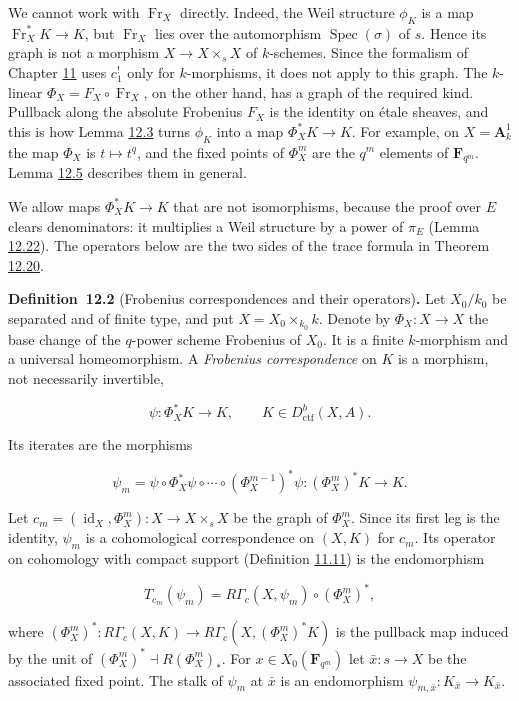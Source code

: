 \documentclass[11pt]{article}
\newenvironment{bpstatement}[2]{\par\addvspace{0.6\baselineskip}\noindent\textbf{#1}#2\textbf{.}\enspace\ignorespaces}
  {\par\addvspace{0.4\baselineskip}}
\begin{document}
We cannot work with \(\operatorname{Fr}_X\) directly. Indeed, the Weil structure \(\phi_K\) is a map \(\operatorname{Fr}_X^*K\to K\), but \(\operatorname{Fr}_X\) lies over the automorphism \(\operatorname{Spec}(\sigma)\) of \(s\). Hence its graph is not a morphism \(X\to X\times_sX\) of \(k\)-schemes. Since the formalism of Chapter \hyperref[bp170]{11} uses \(c_1^!\) only for \(k\)-morphisms, it does not apply to this graph. The \(k\)-linear \(\Phi_X=F_X\circ\operatorname{Fr}_X\), on the other hand, has a graph of the required kind. Pullback along the absolute Frobenius \(F_X\) is the identity on étale sheaves, and this is how Lemma \hyperref[bp234]{12.3} turns \(\phi_K\) into a map \(\Phi_X^*K\to K\). For example, on \(X=\mathbf A^1_k\) the map \(\Phi_X\) is \(t\mapsto t^q\), and the fixed points of \(\Phi_X^m\) are the \(q^m\) elements of \(\mathbf F_{q^m}\). Lemma \hyperref[bp240]{12.5} describes them in general.

We allow maps \(\Phi_X^*K\to K\) that are not isomorphisms, because the proof over \(E\) clears denominators: it multiplies a Weil structure by a power of \(\pi_E\) (Lemma \hyperref[bp294]{12.22}). The operators below are the two sides of the trace formula in Theorem \hyperref[bp287]{12.20}.

\label{bp232}%
\begin{bpstatement}{Definition~12.2}{ (Frobenius correspondences and their operators)}
Let \(X_0/k_0\) be separated and of finite type, and put \(X=X_0\times_{k_0}k\). Denote by \(\Phi_X:X\to X\) the base change of the \(q\)-power scheme Frobenius of \(X_0\). It is a finite \(k\)-morphism and a universal homeomorphism. A \emph{Frobenius correspondence} on \(K\) is a morphism, not necessarily invertible,

\[
\psi:\Phi_X^*K\longrightarrow K,
\qquad K\in D^b_{\mathrm{ctf}}(X,A).
\]

Its iterates are the morphisms

\[
\psi_m=\psi\circ\Phi_X^*\psi\circ\cdots\circ
(\Phi_X^{m-1})^*\psi:(\Phi_X^m)^*K\longrightarrow K.
\]

Let \(c_m=(\operatorname{id}_X,\Phi_X^m):X\to X\times_sX\) be the graph of \(\Phi_X^m\). Since its first leg is the identity, \(\psi_m\) is a cohomological correspondence on \((X,K)\) for \(c_m\). Its operator on cohomology with compact support (Definition \hyperref[bp202]{11.11}) is the endomorphism

\[
T_{c_m}(\psi_m)
=R\Gamma_c(X,\psi_m)\circ(\Phi_X^m)^*,
\]

where \((\Phi_X^m)^*:R\Gamma_c(X,K)\to R\Gamma_c(X,(\Phi_X^m)^*K)\) is the pullback map induced by the unit of \((\Phi_X^m)^*\dashv R(\Phi_X^m)_*\). For \(x\in X_0(\mathbf F_{q^m})\) let \(\bar x:s\to X\) be the associated fixed point. The stalk of \(\psi_m\) at \(\bar x\) is an endomorphism \(\psi_{m,\bar x}:K_{\bar x}\to K_{\bar x}\).
\end{bpstatement}
\end{document}
